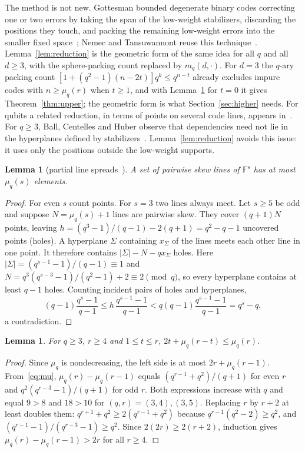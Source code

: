 \documentclass[11pt]{amsart}
\newtheorem{lemma}[theorem]{Lemma}
\theoremstyle{definition}
\theoremstyle{remark}
\newcommand{\F}{\mathbb F}
\begin{document}
The method is not new. Gottesman bounded degenerate binary codes correcting one or two errors by taking the span of the low-weight stabilizers, discarding the positions they touch, and packing the remaining low-weight errors into the smaller fixed space~\cite[Section~7.3]{Gottesman1997}; Nemec and Tansuwannont reuse this technique~\cite[Section~IV, Lemma~1]{NemecTansuwannont2023}. Lemma~\ref{lem:reduction} is the geometric form of the same idea for all $q$ and all $d\ge3$, with the sphere-packing count replaced by $m_q(d,\cdot)$. For $d=3$ the $q$-ary packing count $[1+(q^2-1)(n-2t)]q^k\le q^{n-t}$ already excludes impure codes with $n\ge\mu_q(r)$ when $t\ge1$, and with Lemma~\ref{lem:spread} for $t=0$ it gives Theorem~\ref{thm:upper}; the geometric form is what Section~\ref{sec:higher} needs. For qubits a related reduction, in terms of points on several code lines, appears in~\cite[Theorem~3.2]{BFGMP2008}. For $q\ge3$, Ball, Centelles and Huber observe that dependencies need not lie in the hyperplanes defined by stabilizers~\cite[Section~5]{BallCentellesHuber2023}. Lemma~\ref{lem:reduction} avoids this issue: it uses only the positions outside the low-weight supports.

\begin{lemma}[partial line spreads~\cite{Beutelspacher1975}]\label{lem:spread}
A set of pairwise skew lines of $\F^s$ has at most $\mu_q(s)$ elements.
\end{lemma}

\begin{proof}
For even $s$ count points. For $s=3$ two lines always meet. Let $s\ge5$ be odd and suppose $N=\mu_q(s)+1$ lines are pairwise skew. They cover $(q+1)N$ points, leaving $h=(q^3-1)/(q-1)-2(q+1)=q^2-q-1$ uncovered points (holes). A hyperplane $\Sigma$ containing $x_\Sigma$ of the lines meets each other line in one point. It therefore contains $|\Sigma|-N-qx_\Sigma$ holes. Here $|\Sigma|=(q^{s-1}-1)/(q-1)\equiv1$ and $N=q^3(q^{s-3}-1)/(q^2-1)+2\equiv2\pmod q$, so every hyperplane contains at least $q-1$ holes. Counting incident pairs of holes and hyperplanes,
\[
(q-1)\frac{q^s-1}{q-1}\le h\,\frac{q^{s-1}-1}{q-1}<q(q-1)\frac{q^{s-1}-1}{q-1}=q^s-q,
\]
a contradiction.
\end{proof}

\begin{lemma}\label{lem:ineq}
For $q\ge3$, $r\ge4$ and $1\le t\le r$, $2t+\mu_q(r-t)\le\mu_q(r)$.
\end{lemma}

\begin{proof}
Since $\mu_q$ is nondecreasing, the left side is at most $2r+\mu_q(r-1)$. From~\eqref{eq:mu}, $\mu_q(r)-\mu_q(r-1)$ equals $(q^{r-1}+q^2)/(q+1)$ for even $r$ and $q^2(q^{r-3}-1)/(q+1)$ for odd $r$. Both expressions increase with $q$ and equal $9>8$ and $18>10$ for $(q,r)=(3,4),(3,5)$. Replacing $r$ by $r+2$ at least doubles them: $q^{r+1}+q^2\ge2(q^{r-1}+q^2)$ because $q^{r-1}(q^2-2)\ge q^2$, and $(q^{r-1}-1)/(q^{r-3}-1)\ge q^2$. Since $2(2r)\ge2(r+2)$, induction gives $\mu_q(r)-\mu_q(r-1)>2r$ for all $r\ge4$.
\end{proof}
\end{document}
